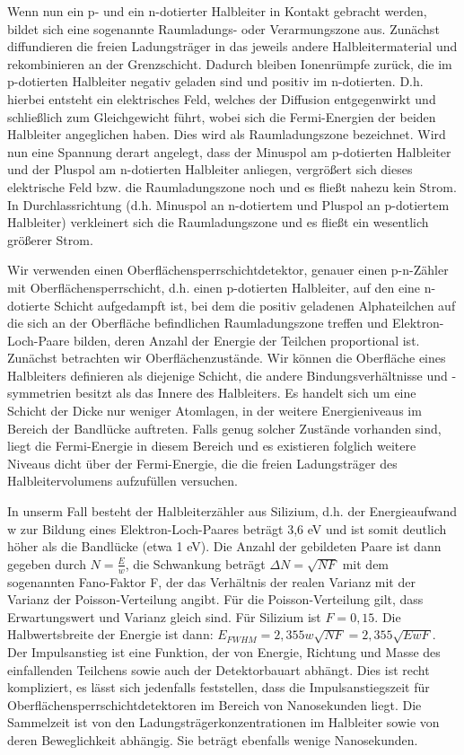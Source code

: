 \documentclass[bigchapter,colorback,accentcolor=tud4b,linedtoc,11pt]{tudreport}
\begin{document}
Wenn nun ein p- und ein n-dotierter Halbleiter in Kontakt gebracht werden, bildet sich eine sogenannte Raumladungs- oder Verarmungszone aus. Zunächst diffundieren die freien Ladungsträger in das jeweils andere Halbleitermaterial und rekombinieren an der Grenzschicht. Dadurch bleiben Ionenrümpfe zurück, die im p-dotierten Halbleiter negativ geladen sind und positiv im n-dotierten. D.h. hierbei entsteht ein elektrisches Feld, welches der Diffusion entgegenwirkt und schließlich zum Gleichgewicht führt, wobei sich die Fermi-Energien der beiden Halbleiter angeglichen haben. Dies wird als Raumladungszone bezeichnet. Wird nun eine Spannung derart angelegt, dass der Minuspol am p-dotierten Halbleiter und der Pluspol am n-dotierten Halbleiter anliegen, vergrößert sich dieses elektrische Feld bzw. die Raumladungszone noch und es fließt nahezu kein Strom. In Durchlassrichtung (d.h. Minuspol an n-dotiertem und Pluspol an p-dotiertem Halbleiter) verkleinert sich die Raumladungszone und es fließt ein wesentlich größerer Strom.

Wir verwenden einen Oberflächensperrschichtdetektor, genauer einen p-n-Zähler mit Oberflächensperrschicht, d.h. einen p-dotierten Halbleiter, auf den eine n-dotierte Schicht aufgedampft ist, bei dem die positiv geladenen Alphateilchen auf die sich an der Oberfläche befindlichen Raumladungszone treffen und Elektron-Loch-Paare bilden, deren Anzahl der Energie der Teilchen proportional ist. Zunächst betrachten wir Oberflächenzustände. Wir können die Oberfläche eines Halbleiters definieren als diejenige Schicht, die andere Bindungsverhältnisse und -symmetrien besitzt als das Innere des Halbleiters. Es handelt sich um eine Schicht der Dicke nur weniger Atomlagen, in der weitere Energieniveaus im Bereich der Bandlücke auftreten. Falls genug solcher Zustände vorhanden sind, liegt die Fermi-Energie in diesem Bereich und es existieren folglich weitere Niveaus dicht über der Fermi-Energie, die die freien Ladungsträger des Halbleitervolumens aufzufüllen versuchen. 

In unserm Fall besteht der Halbleiterzähler aus Silizium, d.h. der Energieaufwand w zur Bildung eines Elektron-Loch-Paares beträgt 3,6 eV und ist somit deutlich höher als die Bandlücke (etwa 1 eV). Die Anzahl der gebildeten Paare ist dann gegeben durch $N = \frac{E}{w}$, die Schwankung beträgt $\Delta N = \sqrt{N F}$ mit dem sogenannten Fano-Faktor F, der das Verhältnis der realen Varianz mit der Varianz der Poisson-Verteilung angibt. Für die Poisson-Verteilung gilt, dass Erwartungswert und Varianz gleich sind. Für Silizium ist $F = 0,15$. Die Halbwertsbreite der Energie ist dann: $E_{FWHM} = 2,355 w \sqrt{N F} = 2,355 \sqrt{E w F}$.
Der Impulsanstieg ist eine Funktion, der von Energie, Richtung und Masse des einfallenden Teilchens sowie auch der Detektorbauart abhängt. Dies ist recht kompliziert, es lässt sich jedenfalls feststellen, dass die Impulsanstiegszeit für Oberflächensperrschichtdetektoren im Bereich von Nanosekunden liegt. Die Sammelzeit ist von den Ladungsträgerkonzentrationen im Halbleiter sowie von deren Beweglichkeit abhängig. Sie beträgt ebenfalls wenige Nanosekunden.
\end{document}
